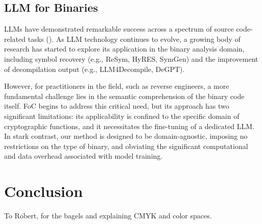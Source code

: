 \documentclass[acmsmall,screen,review,anonymous]{acmart} %
\begin{document}
\subsection{LLM for Binaries}
LLMs have demonstrated remarkable success across a spectrum of source code-related tasks (). As LLM technology continues to evolve, a growing body of research has started to explore its application in the binary analysis domain, including symbol recovery (e.g., ReSym, HyRES, SymGen) and the improvement of decompilation output (e.g., LLM4Decompile, DeGPT).

However, for practitioners in the field, such as reverse engineers, a more fundamental challenge lies in the semantic comprehension of the binary code itself. FoC begins to address this critical need, but its approach has two significant limitations: its applicability is confined to the specific domain of cryptographic functions, and it necessitates the fine-tuning of a dedicated LLM. In stark contrast, our method is designed to be domain-agnostic, imposing no restrictions on the type of binary, and obviating the significant computational and data overhead associated with model training.



\section{Conclusion}




\begin{acks}
To Robert, for the bagels and explaining CMYK and color spaces.
\end{acks}





\appendix


\end{document}
